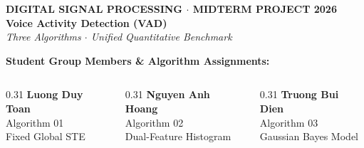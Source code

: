 \documentclass[aspectratio=169, 10pt]{beamer}
\begin{document}
\begin{frame}[plain]
  \vspace{0.15cm}
  \begin{tcolorbox}[contentframe, width=0.96\textwidth, center]
  \begin{center}
    \vspace{0.1cm}
    {\fontsize{9pt}{11pt}\selectfont\color{cyanAccent}\textbf{DIGITAL SIGNAL PROCESSING $\cdot$ MIDTERM PROJECT 2026}} \\[6pt]
    {\fontsize{24pt}{27pt}\selectfont\color{textWhite}\textbf{Voice Activity Detection (VAD)}} \\[4pt]
    {\fontsize{13pt}{15pt}\selectfont\color{cyanGlow}\textit{Three Algorithms $\cdot$ Unified Quantitative Benchmark}} \\[14pt]

    \begin{tcolorbox}[glowcard, width=0.92\textwidth]
      \centering
      {\fontsize{9pt}{11pt}\selectfont\color{textMuted}\textbf{Student Group Members \& Algorithm Assignments:}}\\[6pt]
      \begin{columns}[c]
        \begin{column}{0.31\textwidth}
          \centering
          {\fontsize{9.5pt}{11pt}\selectfont\color{cyanGlow}\textbf{Luong Duy Toan}}\\[2pt]
          {\fontsize{7.5pt}{9pt}\selectfont\color{textMuted}Algorithm 01}\\[1pt]
          {\fontsize{7.5pt}{8.5pt}\selectfont Fixed Global STE}
        \end{column}
        \begin{column}{0.31\textwidth}
          \centering
          {\fontsize{9.5pt}{11pt}\selectfont\color{mintGreen}\textbf{Nguyen Anh Hoang}}\\[2pt]
          {\fontsize{7.5pt}{9pt}\selectfont\color{textMuted}Algorithm 02}\\[1pt]
          {\fontsize{7.5pt}{8.5pt}\selectfont Dual-Feature Histogram}
        \end{column}
        \begin{column}{0.31\textwidth}
          \centering
          {\fontsize{9.5pt}{11pt}\selectfont\color{cyanAccent}\textbf{Truong Bui Dien}}\\[2pt]
          {\fontsize{7.5pt}{9pt}\selectfont\color{textMuted}Algorithm 03}\\[1pt]
          {\fontsize{7.5pt}{8.5pt}\selectfont Gaussian Bayes Model}
        \end{column}
      \end{columns}
    \end{tcolorbox}


\end{center}
\end{tcolorbox}
\end{frame}
\end{document}
